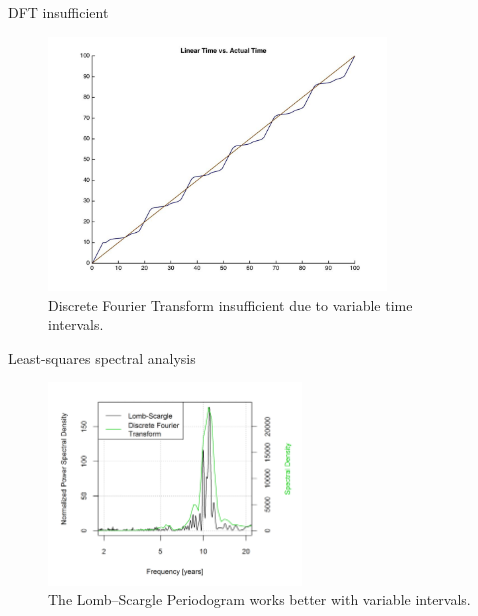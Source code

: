 \documentclass{beamer}
\begin{document}
\begin{frame}{DFT insufficient}
  \begin{figure}
    \centering
    \includegraphics[width = 0.8\textwidth]{./images/lintimevsactualtime.jpg}
    \caption{Discrete Fourier Transform insufficient due to variable time intervals.}
  \end{figure}
\end{frame}

\begin{frame}{Least-squares spectral analysis}
  \begin{figure}
    \centering
    \includegraphics[width = 0.6\textwidth]{lomb_vs_FFT.png}
    \caption{The Lomb–Scargle Periodogram works better with variable intervals.}
  \end{figure}
\end{frame}
\end{document}
